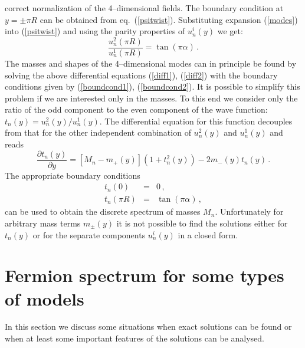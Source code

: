 \documentclass[a4paper,12pt]{article}
\def\pa{\partial}
\def\al{\alpha}
\begin{document}
correct normalization of the 4--dimensional fields. The boundary
condition at $y=\pm\pi R$ can be obtained from eq.\ (\ref{psitwist}).
Substituting expansion (\ref{modes}) into (\ref{psitwist}) and using
the parity properties of $u_n^i(y)$ we get:
\begin{equation}
\frac{u_n^2(\pi R)}{u_n^1(\pi R)}
=
\tan(\pi\al)
\,.
\label{boundcond2}
\end{equation}
The masses and shapes of the 4--dimensional modes can in principle be
found by solving the above differential equations (\ref{diff1}), 
(\ref{diff2}) with the boundary conditions given by
(\ref{boundcond1}), (\ref{boundcond2}). It is possible to simplify this
problem if we are interested only in the masses. To this end we
consider only the ratio of the odd component to the even component of
the wave function: $t_n(y)=u_n^2(y)/u_n^1(y)$. The differential
equation for this function decouples from that for the other
independent combination of $u_n^2(y)$ and $u_n^1(y)$ and reads
\begin{equation}
\frac{\pa t_n(y)}{\pa y}
=
[M_n-m_+(y)]\left(1+t_n^2(y)\right)-2m_-(y)t_n(y)
\,.
\label{difft}
\end{equation}
The appropriate boundary conditions
\begin{eqnarray}
t_n(0)&\!\!\!=\!\!\!&0
\,,\label{boundcond1t}
\\[6pt]
t_n(\pi R)&\!\!\!=\!\!\!&\tan(\pi\al)
\,,\label{boundcond2t}
\end{eqnarray}
can be used to obtain the discrete spectrum of masses $M_n$.
Unfortunately for arbitrary mass terms
$m_\pm(y)$ it is not possible to find the solutions either for
$t_n(y)$ or for the separate components $u_n^i(y)$ in a closed form.  




\section{Fermion spectrum for some types of models}

In this section we discuss some situations when exact solutions
can be found or when at least some important features of the solutions
can be analysed. 
\end{document}
